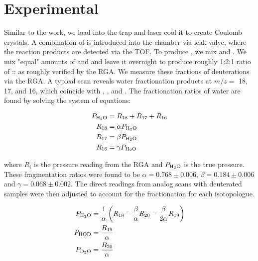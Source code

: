 \section{Experimental}

Similar to the  work, we load  into the trap and laser cool it to create Coulomb crystals. A combination of  is introduced into the chamber via leak valve, where the reaction products are detected via the TOF. To produce , we mix  and .\cite{Pyper1967,Zhou2013} We mix "equal" amounts of  and  and leave it overnight to produce roughly 1:2:1 ratio of :: as roughly verified by the RGA. We measure these fractions of deuterations via the RGA. A typical scan reveals water fractionation products at $m/z =$ 18, 17, and 16, which coincide with , , and . The fractionation ratios of water are found by solving the system of equations:

\begin{align}
	P_{\ce{H2O}} & = R_{18} + R_{17} + R_{16} \\
	R_{18} & = \alpha P_{\ce{H2O}} \\
	R_{17} & = \beta P_{\ce{H2O}} \\
	R_{16} & = \gamma P_{\ce{H2O}}
\end{align}

where $R_i$ is the pressure reading from the RGA and $P_{\ce{H2O}}$ is the true  pressure. These fragmentation ratios were found to be $\alpha = 0.768 \pm 0.006$, $\beta = 0.184 \pm 0.006$ and $\gamma = 0.068 \pm 0.002$. The direct readings from analog scans with deuterated samples were then adjusted to account for the fractionation for each isotopologue.

\begin{align}
	P_{\ce{H2O}} & = \frac{1}{\alpha}\left(R_{18} - \frac{\beta}{\alpha}R_{20} - \frac{\beta}{2\alpha} R_{19}\right) \\
	P_{\ce{HOD}} & = \frac{R_{19}}{\alpha} \\
	P_{\ce{D2O}} & = \frac{R_{20}}{\alpha}
\end{align}

